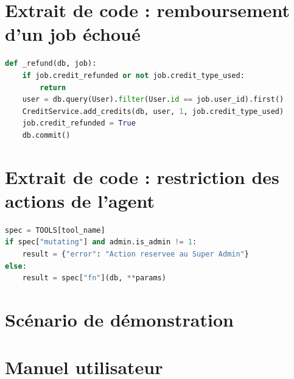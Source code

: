\section{Extrait de code : remboursement d'un job échoué}
\begin{lstlisting}[language=Python,caption={Remboursement idempotent du crédit d'un job (extrait simplifié)},label={lst-refund}]
def _refund(db, job):
    if job.credit_refunded or not job.credit_type_used:
        return
    user = db.query(User).filter(User.id == job.user_id).first()
    CreditService.add_credits(db, user, 1, job.credit_type_used)
    job.credit_refunded = True
    db.commit()
\end{lstlisting}

\section{Extrait de code : restriction des actions de l'agent}
\begin{lstlisting}[language=Python,caption={Actions mutantes de Jannet réservées au super admin (extrait simplifié)},label={lst-agent}]
spec = TOOLS[tool_name]
if spec["mutating"] and admin.is_admin != 1:
    result = {"error": "Action reservee au Super Admin"}
else:
    result = spec["fn"](db, **params)
\end{lstlisting}

\section{Scénario de démonstration}

\section{Manuel utilisateur}
